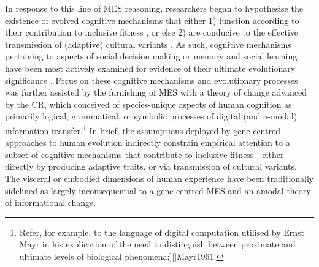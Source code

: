 \begin{CJK}{UTF8}{gbsn}
In response to this line of MES reasoning, researchers began to hypothesise the existence of evolved cognitive mechanisms that either 1) function according to their contribution to inclusive fitness \citep[an approach that has since matured into the field of evolutionary psychology][]{Cosmides1992}, or else 2) are conducive to the effective \citep[i.e. ``cumulative'' see][]{Tomasello1993} transmission of (adaptive) cultural variants \citep[an approach that has since matured into the field of cultural evolution][]{Cavalli-Sforza1981,Boyd1988}.
As such, cognitive mechanisms pertaining to aspects of social decision making \citep[in the case of game-theoretical models of cooperation, see][]{Cosmides1989,West2011} or memory and social learning \citep[in the case of gene-culture coevolutionary models][]{Henrich2003} have been most actively examined for evidence of their ultimate evolutionary significance \citep{Badcock2012}.  Focus on these cognitive mechanisms and evolutionary processes was further assisted by the furnishing of MES with a theory of change advanced by the CR, which conceived of species-unique aspects of human cognition as primarily logical, grammatical, or symbolic processes of digital (and a-modal) information transfer.\footnote{Refer, for example, to the language of digital computation utilised by Ernst Mayr in his explication of the need to distinguish between proximate and ultimate levels of biological phenomena;][]{Mayr1961}.}  In brief, the assumptions deployed by gene-centred approaches to human evolution indirectly constrain empirical attention to a subset of cognitive mechanisms that contribute to inclusive fitness---either directly by producing adaptive traits, or via transmission of cultural variants.  The visceral or embodied dimensions of human experience have been traditionally sidelined as largely inconsequential to a gene-centred MES and an amodal theory of informational change.


\end{CJK}
